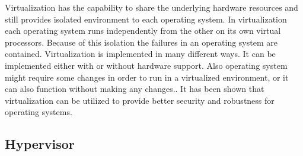 Virtualization has the capability to share the underlying hardware resources and still provides isolated environment to each operating system. In virtualization each operating system runs independently from the other on its own virtual processors. Because of this isolation the failures in an operating system are contained. Virtualization is implemented in many different ways. It can be implemented either with or without hardware support. Also operating system might require some changes in order to run in a virtualized environment, or it can also function without making any changes.\cite{Drepper:2008:CV:1348583.1348591}. It has been shown that virtualization can be utilized to provide better security and robustness for operating systems\cite{Fraser04safehardware, LeVasseur04UnmodifiedDriverReuse, Riley:2008:GPK:1433006.1433008}.

\subsection{Hypervisor}

